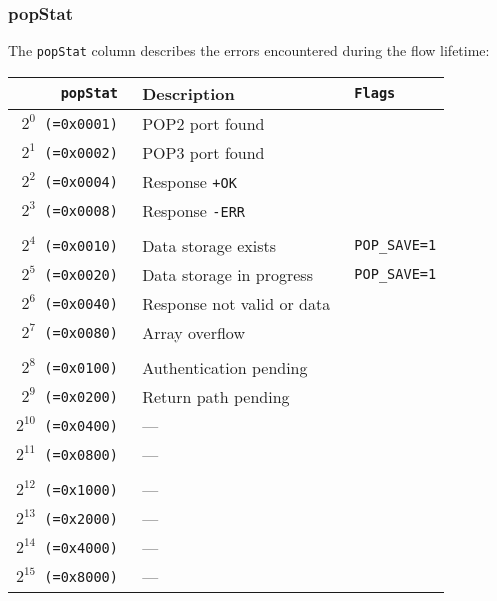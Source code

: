 \documentclass[documentation]{subfiles}
\begin{document}
\subsubsection{popStat}\label{popStat}
The {\tt popStat} column describes the errors encountered during the flow lifetime:
\begin{longtable}{>{\tt}rl>{\tt\small}l}
    \toprule
    {\bf popStat} & {\bf Description} & {\bf Flags}\\
    \midrule\endhead%
    $2^{0}$  (=0x0001) & POP2 port found            & \\
    $2^{1}$  (=0x0002) & POP3 port found            & \\
    $2^{2}$  (=0x0004) & Response {\tt +OK}         & \\
    $2^{3}$  (=0x0008) & Response {\tt -ERR}        & \\
    \\
    $2^{4}$  (=0x0010) & Data storage exists        & POP\_SAVE=1\\
    $2^{5}$  (=0x0020) & Data storage in progress   & POP\_SAVE=1\\
    $2^{6}$  (=0x0040) & Response not valid or data & \\
    $2^{7}$  (=0x0080) & Array overflow             & \\
    \\
    $2^{8}$  (=0x0100) & Authentication pending     & \\
    $2^{9}$  (=0x0200) & Return path pending        & \\
    $2^{10}$ (=0x0400) & ---                        & \\
    $2^{11}$ (=0x0800) & ---                        & \\
    \\
    $2^{12}$ (=0x1000) & ---                        & \\
    $2^{13}$ (=0x2000) & ---                        & \\
    $2^{14}$ (=0x4000) & ---                        & \\
    $2^{15}$ (=0x8000) & ---                        & \\
    \bottomrule
\end{longtable}
\end{document}

